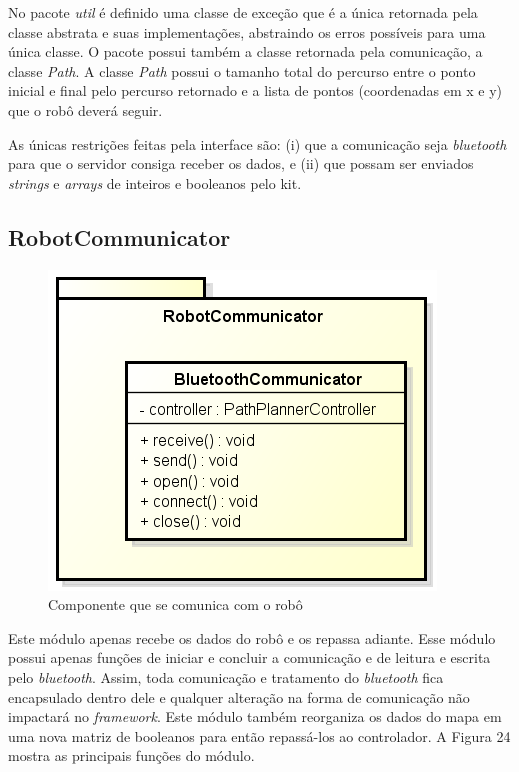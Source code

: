No pacote \textit{util} é definido uma classe de exceção que é a única retornada pela classe abstrata e suas implementações, abstraindo os erros possíveis para uma única classe. O pacote possui também a classe retornada pela comunicação, a classe \textit{Path}. A classe \textit{Path} possui o tamanho total do percurso entre o ponto inicial e final pelo percurso retornado e a lista de pontos (coordenadas em x e y) que o robô deverá seguir.

As únicas restrições feitas pela interface são: (i) que a comunicação seja \textit{bluetooth} para que o servidor consiga receber os dados, e (ii) que possam ser enviados \textit{strings} e \textit{arrays} de inteiros e booleanos pelo kit.

\subsection{RobotCommunicator}

\begin{figure}[h]
	\centering
	\label{fig24}
		\includegraphics[keepaspectratio=true,scale=0.6]{figuras/tcp.png}
	\caption{Componente que se comunica com o robô}
\end{figure}

Este módulo apenas recebe os dados do robô e os repassa adiante. Esse módulo possui apenas funções de iniciar e concluir a comunicação e de leitura e escrita pelo \textit{bluetooth}. Assim, toda comunicação e tratamento do \textit{bluetooth} fica encapsulado dentro dele e qualquer alteração na forma de comunicação não impactará no \textit{framework}. Este módulo também reorganiza os dados do mapa em uma nova matriz de booleanos para então repassá-los ao controlador. A Figura 24 mostra as principais funções do módulo.

